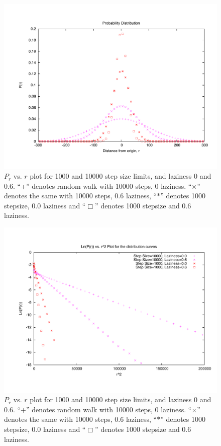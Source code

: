\documentclass[12pt]{article}
\begin{document}
\begin{figure}
\centering
\includegraphics[width=\textwidth]{distribution.pdf}
\caption{$P_r$ vs. $r$ plot for 1000 and 10000 step size limits, and laziness 0 and 0.6. ``+'' denotes random walk with 10000 steps, 0 laziness. ``$\times$'' denotes the same with 10000 steps, 0.6 laziness, ``$\ast$'' denotes 1000 stepsize, 0.0 laziness and ``$\Box$'' denotes 1000 stepsize and 0.6 laziness.}
\label{fig:distribution}
\end{figure}

\newpage
\begin{figure}
\centering
\includegraphics[width=\textwidth]{dist_st.pdf}
\caption{$P_r$ vs. $r$ plot for 1000 and 10000 step size limits, and laziness 0 and 0.6. ``+'' denotes random walk with 10000 steps, 0 laziness. ``$\times$'' denotes the same with 10000 steps, 0.6 laziness, ``$\ast$'' denotes 1000 stepsize, 0.0 laziness and ``$\Box$'' denotes 1000 stepsize and 0.6 laziness.}
\label{fig:dist_st}
\end{figure}
\end{document}
